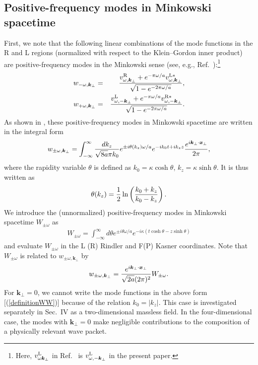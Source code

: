 \documentclass[aps,prd,preprintnumbers,nofootinbib,showpacs,11pt]{revtex4}%
\begin{document}
\begin{widetext}
\subsection{Positive-frequency modes in Minkowski spacetime  \label{3A}}
First, we note that the following 
linear combinations of the mode functions in the R and L regions (normalized with respect to the Klein--Gordon inner product) are positive-frequency modes in the Minkowski sense (see, e.g., Ref.~\cite{Higuchi}):\footnote{Here,
$v_{\omega{\bm k}_\perp}^{{\rm L}}$ in Ref.~\cite{Higuchi} is $v_{\omega,-{\bm k}_\perp}^{{\rm L}}$ in the present paper.}
\begin{eqnarray}
w_{- \omega,{\bm k}_\perp}
& = & \frac{v^\R_{\omega, {\bm k}_\perp} + e^{-\pi\omega/a}v_{\omega,{\bm k}_\perp}^{\L*}}{\sqrt{ 1 - e^{-2\pi\omega/a}}},
\label{eqfivea}
\\
w_{+\omega,{\bm k}_\perp}
& = & \frac{v^\L_{\omega,-{\bm k}_\perp} + e^{-\pi\omega/a}v_{\omega,-{\bm k}_\perp}^{\R*}}{\sqrt{1-e^{-2\pi \omega/a}}} .
\label{eqsixa}
\end{eqnarray}
As shown in \cite{Higuchi}, 
these positive-frequency modes in Minkowski spacetime are written in the integral form
\begin{eqnarray}
w_{\pm\omega,\bm k_\perp}=\int_{-\infty}^{\infty} {dk_z\over \sqrt{8a}\pi k_0}e^{\pm i\theta(k_z)\omega/a}
e^{-ik_0t+ik_zz}{e^{i\bm k_\perp\cdot \bm x_\perp}\over 2\pi},
\label{definitionw}
\end{eqnarray}
where the rapidity variable $\theta$ is defined as $k_0=\kappa \cosh\theta$, $k_z=\kappa \sinh\theta$.
It is thus written as 
\begin{eqnarray}
\theta(k_z)={1\over 2}\ln\left({k_0+k_z\over k_0-k_z}\right).
\label{definitiontheta}
\end{eqnarray}
We introduce the (unnormalized) positive-frequency modes in Minkowski spacetime $W_{\pm \omega}$ as
\begin{eqnarray}
W_{\pm \omega}=\int_{-\infty}^{\infty} {d\theta }e^{\pm i\theta\omega/a} e^{-i\kappa (t\cosh \theta-z\sinh\theta)}
\label{definitionWW}
\end{eqnarray}
and evaluate $W_{\pm \omega}$ in the L (R) Rindler and F(P) Kasner coordinates. 
Note that $W_{\pm \omega}$ is related to $w_{\pm\omega,\bm k_\perp}$ by
 \begin{eqnarray}
w_{\pm\omega,\bm k_\perp}={e^{i\bm k_\perp\cdot \bm x_\perp}\over \sqrt{2a}(2\pi)^2} W_{\pm \omega}.
\end{eqnarray}
For $\bm k_\perp=0$, we cannot write the 
mode functions in the above form [(\ref{definitionWW})] because of the relation $k_0=|k_z|$. 
This case is investigated separately in Sec.~IV as a two-dimensional massless field. 
In the four-dimensional case, the modes with $\bm k_\perp=0$ 
make negligible contributions to the composition of a physically relevant wave 
packet.


\end{widetext}
\end{document}
